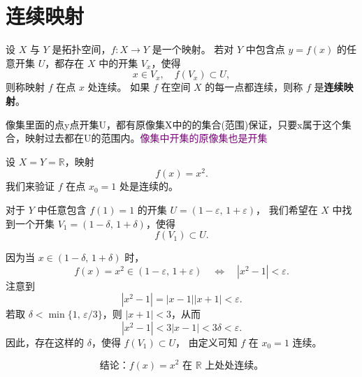 \chapter{连续映射}
\begin{definition}[连续映射]
设 \(X\) 与 \(Y\) 是拓扑空间，\(f: X \to Y\) 是一个映射。  
若对 \(Y\) 中包含点 \(y=f(x)\) 的任意开集 \(U\)，都存在 \(X\) 中的开集 \(V_x\)，使得
\[
x\in V_x,\quad f(V_x)\subset U,
\]
则称映射 \(f\) 在点 \(x\) 处连续。  
如果 \(f\) 在空间 \(X\) 的每一点都连续，则称 \(f\) 是\textbf{连续映射}。
\end{definition}
\begin{note}
    像集里面的点y点开集U，都有原像集X中的的集合(范围)保证，只要x属于这个集合，映射过去都在U的范围内。\textcolor{purple}{像集中开集的原像集也是开集}
\end{note}
\begin{example}[实函数的连续性]
设 \(X=Y=\mathbb{R}\)，映射
\[
f(x)=x^2.
\]
我们来验证 \(f\) 在点 \(x_0=1\) 处是连续的。

对于 \(Y\) 中任意包含 \(f(1)=1\) 的开集 \(U=(1-\varepsilon,\,1+\varepsilon)\)，  
我们希望在 \(X\) 中找到一个开集 \(V_1=(1-\delta,\,1+\delta)\)，使得
\[
f(V_1)\subset U.
\]

因为当 \(x\in(1-\delta,\,1+\delta)\) 时，
\[
f(x)=x^2\in(1-\varepsilon,\,1+\varepsilon)
\quad\Longleftrightarrow\quad
|x^2-1|<\varepsilon.
\]
注意到
\[
|x^2-1|=|x-1||x+1|<\varepsilon.
\]
若取 \(\delta<\min\{1,\,\varepsilon/3\}\)，则 \(|x+1|<3\)，从而
\[
|x^2-1|<3|x-1|<3\delta<\varepsilon.
\]
因此，存在这样的 \(\delta\)，使得 \(f(V_1)\subset U\)，
由定义可知 \(f\) 在 \(x_0=1\) 连续。

\[
\boxed{\text{结论：} f(x)=x^2 \text{ 在 }\mathbb{R}\text{ 上处处连续。}}
\]
\end{example}
